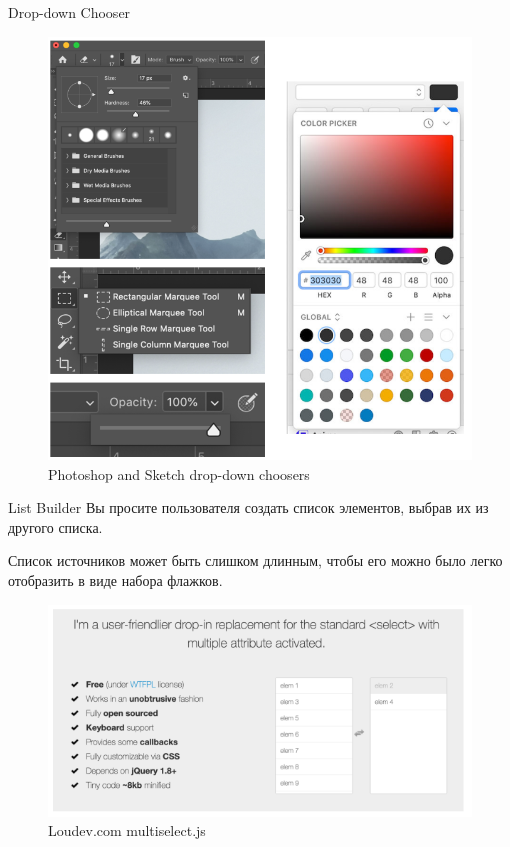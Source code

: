 \documentclass{beamer}
\begin{document}
\begin{frame}[t]{Drop-down Chooser}
	\begin{figure}[h]
		\centering
		\includegraphics[scale=0.35]{images/lec08-pic57.png}
		\caption{Photoshop and Sketch drop-down choosers}
	\end{figure}
\end{frame}

\begin{frame}[t]{List Builder}
	Вы просите пользователя создать список элементов, выбрав их из другого списка. 
	
	Список источников может быть слишком длинным, чтобы его можно было легко отобразить в виде набора флажков.
	\begin{figure}[h]
		\centering
		\includegraphics[scale=0.5]{images/lec08-pic58.png}
		\caption{Loudev.com multiselect.js}
	\end{figure}
\end{frame}
\end{document}
